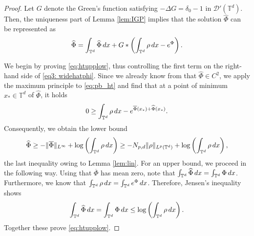 \documentclass[11pt,reqno,a4paper]{amsart}
\newcommand{\intt}{\int_{\T^d}}
\newcommand{\ov}{\overline}
\theoremstyle{definition}
\theoremstyle{remark}
\numberwithin{equation}{section}
\newcommand{\T} {\mathbb T}
\newcommand{\lt}{\left}
\newcommand{\rt}{\right}
\newcommand{\calD}{\mathcal D}
\newcommand{\dx}{\textnormal{d}x}
\begin{document}
\begin{proof} Let $G$ denote the Green's function satisfying $-\Delta G = \delta_0 -1$ in $\calD'(\T^d)$. Then, the uniqueness part of Lemma \ref{lem:IGP} implies that the solution $\widehat{\Phi}$ can be represented as
\begin{equation}\label{eq3: widehatphi}
\widehat{\Phi} = \int_{\T^d} \widehat{\Phi} \,\dx + G * \lt(\intt \rho\,\dx - e^{\Phi}\rt).
\end{equation}

We begin by proving \eqref{eq:htupplow}, thus controlling the first term on the right-hand side of \eqref{eq3: widehatphi}. Since we already know from \cite{griffinpickeringiacobelli2021Torus} that $\widehat{\Phi}\in C^2$, we apply the maximum principle to \eqref{eq:pb_ht} and find that at a point of minimum $x_*\in \T^d$ of $\widehat{\Phi}$, it holds
\begin{align*}
    0 \ge \intt \rho \,\dx - e^{\overline{\Phi}(x_*) + \widehat{\Phi}(x_*)}.
\end{align*}
Consequently, we obtain the lower bound
\begin{align*}
    \widehat{\Phi} \ge - \|\ov{\Phi}\|_{L^\infty} + \log \lt(\intt \rho \,\dx \rt) \ge - N_{p,d}\|\rho\|_{L^p(\T^d)} + \log \lt(\intt \rho \,\dx \rt),
\end{align*}
the last inequality owing to Lemma \ref{lem:lin}.
For an upper bound, we proceed in the following way. Using that $\ov{\Phi}$ has mean zero, note that $\intt \widehat{\Phi} \,\dx = \intt \Phi\,\dx$. Furthermore, we know that $\intt \rho \,\dx = \intt e^{\Phi} \,\dx$. Therefore, Jensen's inequality shows
\begin{align*}
    \intt \widehat{\Phi} \,\dx = \intt \Phi \,\dx \le \log \lt(\intt \rho \,\dx \rt).
\end{align*}
Together these prove \eqref{eq:htupplow}.


\end{proof}
\end{document}
